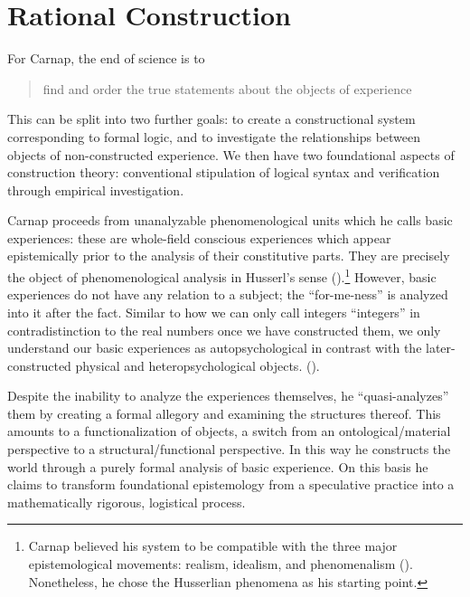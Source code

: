 \documentclass[leqno, 12pt]{turabian-researchpaper}
\begin{document}
	\section{Rational Construction}

	For Carnap, the end of science is to \blockquote[{}]{find and order the true statements about the objects of experience}.
	This can be split into two further goals: to create a constructional system
	corresponding to formal logic, and to investigate the relationships between objects
	of non-constructed experience. We then have two foundational aspects of
	construction theory: conventional stipulation of logical syntax and verification
	through empirical investigation.

	Carnap proceeds from unanalyzable phenomenological units which he calls basic experiences:
	these are whole-field conscious experiences which appear epistemically prior
	to the analysis of their constitutive parts. They are precisely the object of phenomenological
	analysis in Husserl's sense ().\footnote{Carnap
	believed his system to be compatible with the three major epistemological
	movements: realism, idealism, and phenomenalism ().
	Nonetheless, he chose the Husserlian phenomena as his starting point.} However,
	basic experiences do not have any relation to a subject; the \enquote{for-me-ness}
	is analyzed into it after the fact. Similar to how we can only call integers
	\enquote{integers} in contradistinction to the real numbers once we have constructed
	them, we only understand our basic experiences as autopsychological in
	contrast with the later-constructed physical and heteropsychological objects. ().

	Despite the inability to analyze the experiences themselves, he \enquote{quasi-analyzes}
	them by creating a formal allegory and examining the structures thereof. This
	amounts to a functionalization of objects, a switch from an ontological/material
	perspective to a structural/functional perspective. In this way he constructs
	the world through a purely formal analysis of basic experience. On this basis he
	claims to transform foundational epistemology from a speculative practice into
	a mathematically rigorous, logistical process.
\end{document}
